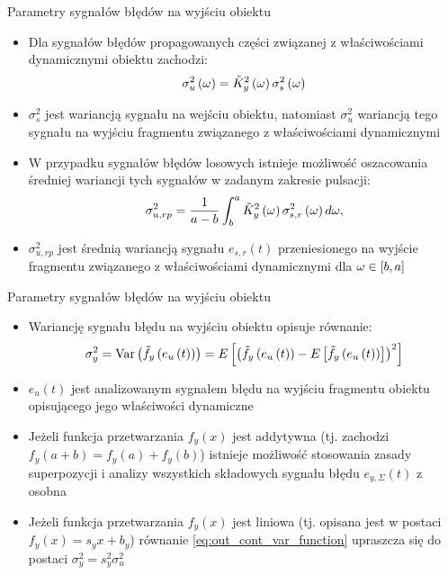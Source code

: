 \documentclass[12pt, polish, aspectratio = 169]{beamer}
\begin{document}
\begin{frame}{Parametry sygnałów błędów na wyjściu obiektu}
\begin{itemize}
\item Dla sygnałów błędów propagowanych części związanej z właściwościami dynamicznymi obiektu zachodzi:
\begin{equation}
\sigma_{u}^{2} \left(\omega\right) = \tilde{K}_{y}^{2} \left(\omega\right) \sigma_{s}^{2} \left(\omega\right) \label{eq:mid_cont_var_omega}
\end{equation}
\item $\sigma_{s}^{2}$ jest wariancją sygnału na wejściu obiektu, natomiast $\sigma_{u}^{2}$ wariancją tego sygnału na wyjściu fragmentu związanego z właściwościami dynamicznymi
\item W przypadku sygnałów błędów losowych istnieje możliwość oszacowania średniej wariancji tych sygnałów w zadanym zakresie pulsacji:
\begin{equation}
\sigma_{u,rp}^{2} = \frac{1}{a - b} \int _{b} ^{a} \tilde{K}_{y}^{2} \left(\omega\right) \sigma_{s,r}^{2} \left(\omega\right) d\omega \label{eq:mid_cont_var_rand},
\end{equation}
\item $\sigma_{u,rp}^{2}$ jest średnią wariancją sygnału $e_{s,r}(t)$ przeniesionego na wyjście fragmentu związanego z właściwościami dynamicznymi dla $\omega \in \interval{b}{a}$
\end{itemize}
\end{frame}

\begin{frame}{Parametry sygnałów błędów na wyjściu obiektu}
\begin{itemize}
\item Wariancję sygnału błędu na wyjściu obiektu opisuje równanie:
\begin{equation}
\sigma_{y}^{2} = \text{Var}\left(\tilde{f}_{y} \left(e_{u} \left(t\right)\right)\right) = E \left[ \left( \tilde{f}_{y} \left(e_{u} \left(t\right)\right) - E \left[ \tilde{f}_{y} \left(e_{u} \left(t\right)\right) \right] \right)^2 \right] \label{eq:out_cont_var_function}
\end{equation}
\item $e_{u}(t)$ jest analizowanym sygnałem błędu na wyjściu fragmentu obiektu opisującego jego właściwości dynamiczne
\item Jeżeli funkcja przetwarzania $f_{y}(x)$ jest addytywna (tj. zachodzi $f_{y}(a+b) = f_{y}(a) + f_{y}(b)$) istnieje możliwość stosowania zasady superpozycji i analizy wszystkich składowych sygnału błędu $e_{y,\Sigma}(t)$ z osobna
\item Jeżeli funkcja przetwarzania $f_{y}(x)$ jest liniowa (tj. opisana jest w postaci $f_{y}(x) = s_{y} x + b_{y}$) równanie \eqref{eq:out_cont_var_function} upraszcza się do postaci $\sigma_{y}^{2} = s_{y}^{2} \sigma_{u}^{2}$
\end{itemize}
\end{frame}
\end{document}
